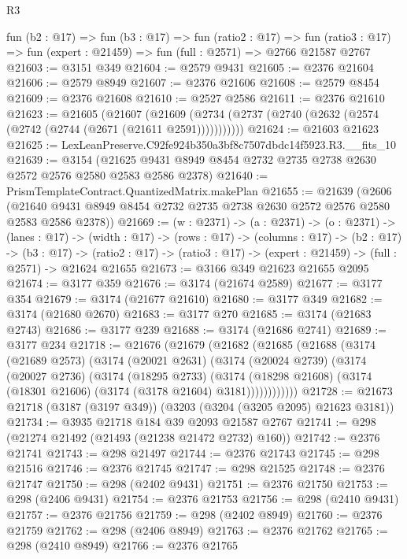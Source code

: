 \begin{lexlean}{R3}
\begin{coremodule}
  fun (b2 : @17) =>
  fun (b3 : @17) =>
  fun (ratio2 : @17) =>
  fun (ratio3 : @17) => fun (expert : @21459) => fun (full : @2571) => @2766 @21587 @2767
@21603 := @3151 @349
@21604 := @2579 @9431
@21605 := @2376 @21604
@21606 := @2579 @8949
@21607 := @2376 @21606
@21608 := @2579 @8454
@21609 := @2376 @21608
@21610 := @2527 @2586
@21611 := @2376 @21610
@21623 := @21605
    (@21607 (@21609 (@2734 (@2737 (@2740 (@2632 (@2574 (@2742 (@2744 (@2671 (@21611 @2591)))))))))))
@21624 := @21603 @21623
@21625 := LexLeanPreserve.C92fe924b350a3bf8c7507dbdc14f5923.R3.__fits_10
@21639 := @3154
    (@21625 @9431 @8949 @8454 @2732 @2735 @2738 @2630 @2572 @2576 @2580 @2583 @2586 @2378)
@21640 := PrismTemplateContract.QuantizedMatrix.makePlan
@21655 := @21639
    (@2606 (@21640 @9431 @8949 @8454 @2732 @2735 @2738 @2630 @2572 @2576 @2580 @2583 @2586 @2378))
@21669 := (w : @2371) ->
  (a : @2371) ->
  (o : @2371) ->
  (lanes : @17) ->
  (width : @17) ->
  (rows : @17) ->
  (columns : @17) ->
  (b2 : @17) ->
  (b3 : @17) ->
  (ratio2 : @17) -> (ratio3 : @17) -> (expert : @21459) -> (full : @2571) -> @21624 @21655
@21673 := @3166 @349 @21623 @21655 @2095
@21674 := @3177 @359
@21676 := @3174 (@21674 @2589)
@21677 := @3177 @354
@21679 := @3174 (@21677 @21610)
@21680 := @3177 @349
@21682 := @3174 (@21680 @2670)
@21683 := @3177 @270
@21685 := @3174 (@21683 @2743)
@21686 := @3177 @239
@21688 := @3174 (@21686 @2741)
@21689 := @3177 @234
@21718 := @21676
    (@21679
      (@21682
        (@21685
          (@21688
            (@3174
              (@21689 @2573)
              (@3174
                (@20021 @2631)
                (@3174
                  (@20024 @2739)
                  (@3174
                    (@20027 @2736)
                    (@3174
                      (@18295 @2733)
                      (@3174
                        (@18298 @21608)
                        (@3174 (@18301 @21606) (@3174 (@3178 @21604) @3181))))))))))))
@21728 := @21673 @21718 (@3187 (@3197 @349)) (@3203 (@3204 (@3205 @2095) @21623 @3181))
@21734 := @3935 @21718 @184 @39 @2093 @21587 @2767
@21741 := @298 (@21274 @21492 (@21493 (@21238 @21472 @2732) @160))
@21742 := @2376 @21741
@21743 := @298 @21497
@21744 := @2376 @21743
@21745 := @298 @21516
@21746 := @2376 @21745
@21747 := @298 @21525
@21748 := @2376 @21747
@21750 := @298 (@2402 @9431)
@21751 := @2376 @21750
@21753 := @298 (@2406 @9431)
@21754 := @2376 @21753
@21756 := @298 (@2410 @9431)
@21757 := @2376 @21756
@21759 := @298 (@2402 @8949)
@21760 := @2376 @21759
@21762 := @298 (@2406 @8949)
@21763 := @2376 @21762
@21765 := @298 (@2410 @8949)
@21766 := @2376 @21765

\end{coremodule}
\end{lexlean}
